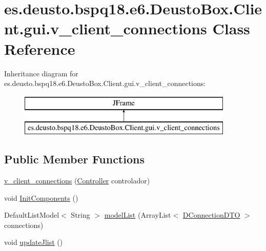 \hypertarget{classes_1_1deusto_1_1bspq18_1_1e6_1_1_deusto_box_1_1_client_1_1gui_1_1v__client__connections}{}\section{es.\+deusto.\+bspq18.\+e6.\+Deusto\+Box.\+Client.\+gui.\+v\+\_\+client\+\_\+connections Class Reference}
\label{classes_1_1deusto_1_1bspq18_1_1e6_1_1_deusto_box_1_1_client_1_1gui_1_1v__client__connections}
Inheritance diagram for es.\+deusto.\+bspq18.\+e6.\+Deusto\+Box.\+Client.\+gui.\+v\+\_\+client\+\_\+connections\+:\begin{figure}[H]
\begin{center}
\leavevmode
\includegraphics[height=2.000000cm]{classes_1_1deusto_1_1bspq18_1_1e6_1_1_deusto_box_1_1_client_1_1gui_1_1v__client__connections}
\end{center}
\end{figure}
\subsection*{Public Member Functions}
\begin{DoxyCompactItemize}
\item 
\mbox{\hyperlink{classes_1_1deusto_1_1bspq18_1_1e6_1_1_deusto_box_1_1_client_1_1gui_1_1v__client__connections_ad30de3e97896536a89155591e779b7b1}{v\+\_\+client\+\_\+connections}} (\mbox{\hyperlink{classes_1_1deusto_1_1bspq18_1_1e6_1_1_deusto_box_1_1_client_1_1controller_1_1_controller}{Controller}} controlador)
\item 
void \mbox{\hyperlink{classes_1_1deusto_1_1bspq18_1_1e6_1_1_deusto_box_1_1_client_1_1gui_1_1v__client__connections_abf8fb0a09f13fb70e8d43873bd270334}{Init\+Components}} ()
\item 
Default\+List\+Model$<$ String $>$ \mbox{\hyperlink{classes_1_1deusto_1_1bspq18_1_1e6_1_1_deusto_box_1_1_client_1_1gui_1_1v__client__connections_a9c7ac85825f5269ebf0c20c57bf6c6e7}{model\+List}} (Array\+List$<$ \mbox{\hyperlink{classes_1_1deusto_1_1bspq18_1_1e6_1_1_deusto_box_1_1_server_1_1dto_1_1_d_connection_d_t_o}{D\+Connection\+D\+TO}} $>$ connections)
\item 
void \mbox{\hyperlink{classes_1_1deusto_1_1bspq18_1_1e6_1_1_deusto_box_1_1_client_1_1gui_1_1v__client__connections_ac4c2d9651e309ba1330267533d8e197e}{update\+Jlist}} ()
\end{DoxyCompactItemize}


